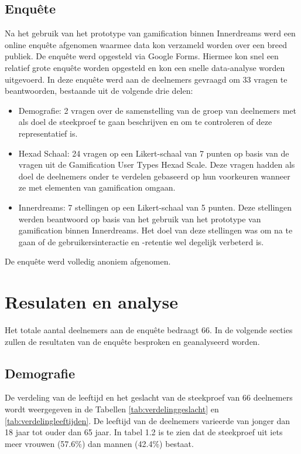 \subsection{Enquête}

Na het gebruik van het prototype van gamification binnen Innerdreams werd een online enquête afgenomen waarmee data kon verzameld worden over een breed publiek. De enquête werd opgesteld via Google Forms. Hiermee kon snel een relatief grote enquête worden opgesteld en kon een snelle data-analyse worden uitgevoerd. In deze enquête werd aan de deelnemers gevraagd om 33 vragen te beantwoorden, bestaande uit de volgende drie delen:

\begin{itemize}
    \item Demografie: 2 vragen over de samenstelling van de groep van deelnemers met als doel de steekproef te gaan beschrijven en om te controleren of deze representatief is.
    \item Hexad Schaal: 24 vragen op een Likert-schaal van 7 punten op basis van de vragen uit de Gamification User Types Hexad Scale. Deze vragen hadden als doel de deelnemers onder te verdelen gebaseerd op hun voorkeuren wanneer ze met elementen van gamification omgaan.
    \item Innerdreams: 7 stellingen op een Likert-schaal van 5 punten. Deze stellingen werden beantwoord op basis van het gebruik van het prototype van gamification binnen Innerdreams. Het doel van deze stellingen was om na te gaan of de gebruikersinteractie en -retentie wel degelijk verbeterd is.
\end{itemize}

De enquête werd volledig anoniem afgenomen.


\section{Resulaten en analyse}

Het totale aantal deelnemers aan de enquête bedraagt 66. 
In de volgende secties zullen de resultaten van de enquête besproken en geanalyseerd worden.

\subsection{Demografie}

De verdeling van de leeftijd en het geslacht van de steekproef van 66 deelnemers wordt weergegeven in de Tabellen \ref{tab:verdelinggeslacht} en \ref{tab:verdelingleeftijden}. De leeftijd van de deelnemers varieerde van jonger dan 18 jaar tot ouder dan 65 jaar. In tabel 1.2 is te zien dat de steekproef uit iets meer vrouwen (57.6\%) dan mannen (42.4\%) bestaat.

